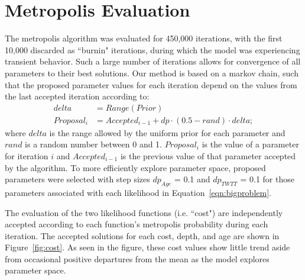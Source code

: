 \renewcommand{\thepage}{S\arabic{page}}  
\renewcommand{\thesection}{S\arabic{section}}   
\renewcommand{\thetable}{S\arabic{table}}   
\renewcommand{\thefigure}{S\arabic{figure}}
\setcounter{figure}{0}

\section{Metropolis Evaluation}

The metropolis algorithm was evaluated for 450,000 iterations, with the first 10,000 discarded as ``burnin" iterations, during which the model was experiencing transient behavior. Such a large number of iterations allows for convergence of all parameters to their best solutions. Our method is based on a markov chain, such that the proposed parameter values for each iteration depend on the values from the last accepted iteration according to:
\begin{equation}\label{eqn:proposal}
\begin{split}
delta&=Range(Prior) \\
Proposal_i&=Accepted_{i-1} + dp \cdot (0.5-rand) \cdot delta; 
\end{split}\tag{S1}
\end{equation}
where $delta$ is the range allowed by the uniform prior for each parameter and $rand$ is a random number between 0 and 1. $Proposal_i$ is the value of a parameter for iteration $i$ and $Accepted_{i-1}$ is the previous value of that parameter accepted by the algorithm. To more efficiently explore parameter space, proposed parameters were selected with step sizes $dp_{Age}$ = 0.1 and $dp_{TWTT}$ = 0.1 for those parameters associated with each likelihood in Equation~\ref{eqn:bigproblem}.

The evaluation of the two likelihood functions (i.e. ``cost") are independently accepted according to each function's metropolis probability during each iteration. The accepted solutions for each cost, depth, and age are shown in Figure~\ref{fig:cost}. As seen in the figure, these cost values show little trend aside from occasional positive departures from the mean as the model explores parameter space. 

